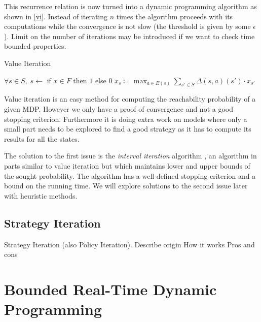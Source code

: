 This recurrence relation is now turned into a dynamic programming
algorithm as shown in \autoref{vi}. Instead of iterating $n$ times the
algorithm proceeds with its computations while the convergence is not
slow (the threshold is given by some $\epsilon$). Limit on the number of
iterations may be introduced if we want to check time bounded
properties.

\begin{algorithm}
\caption{Value Iteration}
\label{vi}
\begin{algorithmic}
    \State $\forall s \in S,\; s \gets$ if $x \in F$ then $1$ else $0$
    \Do
            \State $x_s \coloneqq
            \max_{a \in E(s)} \sum_{s' \in S} \Delta(s,a)(s') \cdot x_{s'}$
        \EndFor
\end{algorithmic}
\end{algorithm}

Value iteration is an easy method for computing the reachability
probability of a given MDP.  However we only have a proof of convergence
and not a good stopping criterion.  Furthermore it is doing extra work
on models where only a small part needs to be explored to find a good
strategy as it has to compute its results for all the states.

The solution to the first issue is the {\em interval iteration}
algorithm \parencite{interval_iteration}, an algorithm in parts similar
to value iteration but which maintains lower and upper bounds of the
sought probability. The algorithm has a well-defined stopping criterion
and a bound on the running time.  We will explore solutions to the
second issue later with heuristic methods.


\subsection{Strategy Iteration}

Strategy Iteration (also Policy Iteration).
Describe origin
How it works
Pros and cons

\section{Bounded Real-Time Dynamic Programming}

